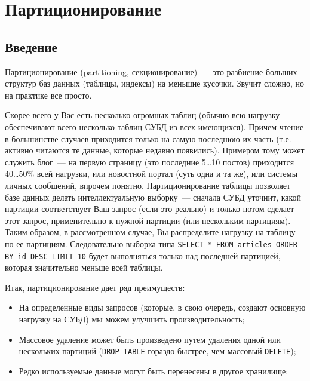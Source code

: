 \chapter{Партиционирование}
\label{sec:partitioning}

\begin{epigraphs}
\end{epigraphs}

\section{Введение}

Партиционирование (partitioning, секционирование)~--- это разбиение больших структур баз данных (таблицы, индексы) на меньшие кусочки. Звучит сложно, но на практике все просто.

Скорее всего у Вас есть несколько огромных таблиц (обычно всю нагрузку обеспечивают всего несколько таблиц СУБД из всех имеющихся). Причем чтение в большинстве случаев приходится только на самую последнюю их часть (т.е. активно читаются те данные, которые недавно появились). Примером тому может служить блог~--- на первую страницу (это последние 5\dots10 постов) приходится 40\dots50\% всей нагрузки, или новостной портал (суть одна и та же), или системы личных сообщений, впрочем понятно. Партиционирование таблицы позволяет базе данных делать интеллектуальную выборку~--- сначала СУБД уточнит, какой партиции соответствует Ваш запрос (если это реально) и только потом сделает этот запрос, применительно к нужной партиции (или нескольким партициям). Таким образом, в рассмотренном случае, Вы распределите нагрузку на таблицу по ее партициям. Следовательно выборка типа \lstinline!SELECT * FROM articles ORDER BY id DESC LIMIT 10! будет выполняться только над последней партицией, которая значительно меньше всей таблицы.

Итак, партиционирование дает ряд преимуществ:

\begin{itemize}
  \item На определенные виды запросов (которые, в свою очередь, создают основную нагрузку на СУБД) мы можем улучшить производительность;
  \item Массовое удаление может быть произведено путем удаления одной или нескольких партиций (\lstinline!DROP TABLE! гораздо быстрее, чем массовый \lstinline!DELETE!);
  \item Редко используемые данные могут быть перенесены в другое хранилище;
\end{itemize}



